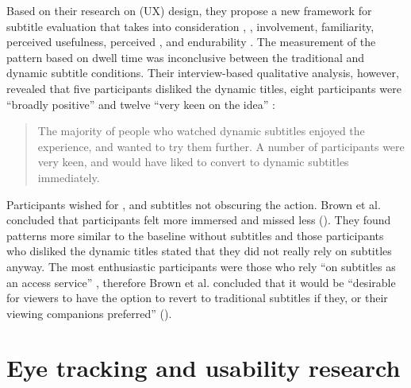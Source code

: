 Based on their research on  (UX) design, they propose a new framework for subtitle evaluation that takes into consideration , , involvement, familiarity, perceived usefulness, perceived , and endurability \citep{Brown2015}. The measurement of the  pattern based on dwell time was inconclusive between the traditional and dynamic subtitle conditions. Their interview-based qualitative analysis, however, revealed that five participants disliked the dynamic titles, eight participants were “broadly positive” and twelve “very keen on the idea” \citep{Brown2015}:
\begin{quote}
The majority of people who watched dynamic subtitles enjoyed the experience, and wanted to try them further. A number of participants were very keen, and would have liked to convert to dynamic subtitles immediately. \citep{Brown2015}
\end{quote}
Participants wished for ,  and subtitles not obscuring the action. Brown et al. concluded that participants felt more immersed and missed less (\citeyear{Brown2015}). They found  patterns more similar to the baseline without subtitles and those participants who disliked the dynamic titles stated that they did not really rely on subtitles anyway. The most enthusiastic participants were those who rely “on subtitles as an access service” \citep{Brown2015}, therefore Brown et al. concluded that it would be “desirable for viewers to have the option to revert to traditional subtitles if they, or their viewing companions preferred” (\citeyear{Brown2015}).

\section{Eye tracking and usability research}\label{sec:6.4}

